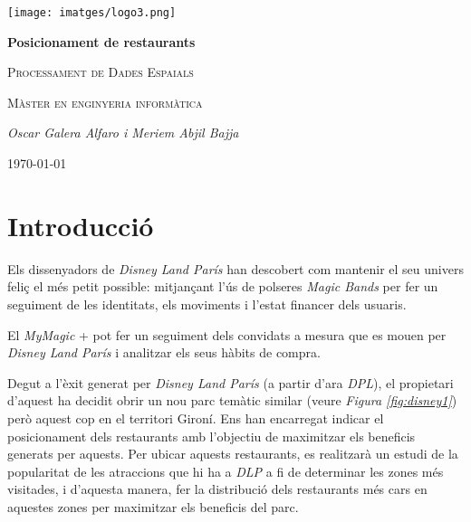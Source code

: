 \documentclass[12pt]{article}
\begin{document}
\begin{titlepage}
		\centering
		\texttt{[image: imatges/logo3.png]}\par\vspace{1cm}
		{\huge\bfseries Posicionament de restaurants\par}
		\vspace{0.3cm}
		{\scshape\Large Processament de Dades Espaials\par}
		\vspace{0.2cm}
		{\scshape\Large Màster en enginyeria informàtica\par}
		\vspace{1.5cm}
		{\Large\itshape Oscar Galera Alfaro i Meriem Abjil Bajja\par}
		\vfill
		{\large \today\par}
\end{titlepage}
\tableofcontents

\clearpage

\listoffigures

\clearpage

\section{Introducció}

Els dissenyadors de \textit{Disney Land París} han descobert com mantenir el seu univers feliç el més petit possible: mitjançant l'ús de polseres \textit{Magic Bands} per fer un seguiment de les identitats, els moviments i l'estat financer dels usuaris.

El \textit{MyMagic } +  pot fer un seguiment dels convidats a mesura que es mouen per \textit{Disney Land París} i analitzar els seus hàbits de compra.

Degut a l'èxit generat per \textit{Disney Land París} (a partir d'ara \textit{DPL}), el propietari d'aquest ha decidit obrir un nou parc temàtic similar (veure \textit{Figura \ref{fig:disney1}}) però aquest cop en el territori Gironí. Ens han encarregat indicar el posicionament dels restaurants amb l'objectiu de maximitzar els beneficis generats per aquests. Per ubicar aquests restaurants, es realitzarà un estudi de la popularitat de les atraccions que hi ha a \textit{DLP} a fi de determinar les zones més visitades, i d'aquesta manera, fer la distribució dels restaurants més cars en aquestes zones per maximitzar els beneficis del parc.
\end{document}
